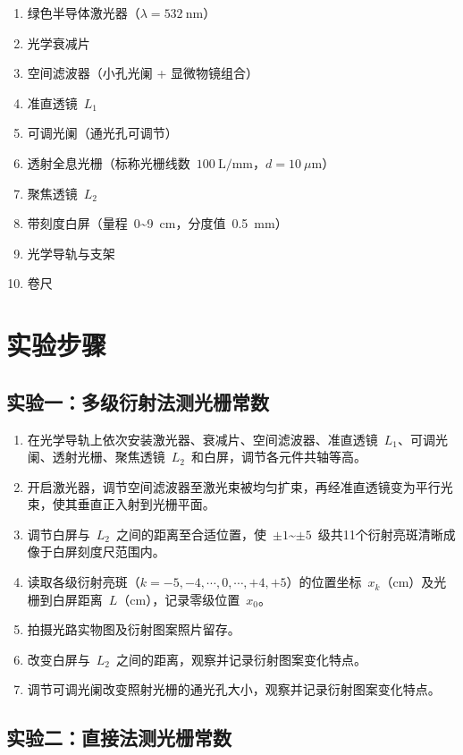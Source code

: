 \documentclass[12pt, a4paper]{article}
\begin{document}
\begin{enumerate}
  \item 绿色半导体激光器（$\lambda = 532~\text{nm}$）
  \item 光学衰减片
  \item 空间滤波器（小孔光阑 + 显微物镜组合）
  \item 准直透镜~$L_1$
  \item 可调光阑（通光孔可调节）
  \item 透射全息光栅（标称光栅线数~$100~\text{L/mm}$，$d = 10~\mu\text{m}$）
  \item 聚焦透镜~$L_2$
  \item 带刻度白屏（量程~0\textasciitilde9~cm，分度值~0.5~mm）
  \item 光学导轨与支架
  \item 卷尺
\end{enumerate}

\section{实验步骤}

\subsection{实验一：多级衍射法测光栅常数}

\begin{enumerate}
  \item 在光学导轨上依次安装激光器、衰减片、空间滤波器、准直透镜~$L_1$、可调光阑、透射光栅、聚焦透镜~$L_2$~和白屏，调节各元件共轴等高。
  \item 开启激光器，调节空间滤波器至激光束被均匀扩束，再经准直透镜变为平行光束，使其垂直正入射到光栅平面。
  \item 调节白屏与~$L_2$~之间的距离至合适位置，使~$\pm1$\textasciitilde$\pm5$~级共11个衍射亮斑清晰成像于白屏刻度尺范围内。
  \item 读取各级衍射亮斑（$k = -5, -4, \cdots, 0, \cdots, +4, +5$）的位置坐标~$x_k$（cm）及光栅到白屏距离~$L$（cm），记录零级位置~$x_0$。
  \item 拍摄光路实物图及衍射图案照片留存。
  \item 改变白屏与~$L_2$~之间的距离，观察并记录衍射图案变化特点。
  \item 调节可调光阑改变照射光栅的通光孔大小，观察并记录衍射图案变化特点。
\end{enumerate}

\subsection{实验二：直接法测光栅常数}
\end{document}
